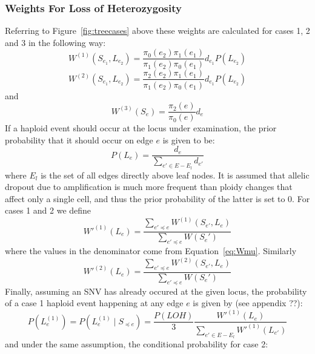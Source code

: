 \documentclass[../../main.tex]{subfiles}
\begin{document}
\subsubsection*{Weights For Loss of Heterozygosity}
 Referring to Figure~\ref{fig:treecases} above these weights are calculated for cases 1, 2 and 3 in the following way:
\begin{equation*}
W^{(1)}(S_{e_1},L_{e_2}) = \frac{\pi_0(e_2)\pi_1(e_1)}{\pi_1(e_2)\pi_0(e_1)}d_{e_1}P(L_{e_2})
\end{equation*}
\begin{equation*}
W^{(2)}(S_{e_1},L_{e_2}) = \frac{\pi_2(e_2)\pi_1(e_1)}{\pi_1(e_2)\pi_0(e_1)}d_{e_1}P(L_{e_2})
\end{equation*}
and
\begin{equation*}
W^{(3)}(S_e) = \frac{\pi_2(e)}{\pi_0(e)}d_e
\end{equation*} 
If a haploid event should occur at the locus under examination, the prior probability that it should occur on edge $e$ is given to be: %
\begin{equation*}
P(L_e) = \frac{d_e}{\sum_{e'\in E-E_l} d_{e'}}
\end{equation*}
where $E_l$ is the set of all edges directly above leaf nodes. It is assumed that allelic dropout due to amplification is much more frequent than ploidy changes that affect only a single cell, and thus the prior probability of the latter is set to 0. For cases 1 and 2 we define
\begin{equation*}
W'^{(1)}(L_e) = \frac{\sum_{e' \preceq e} W^{(1)}(S_{e'},L_e)}{\sum_{e' \preceq e}W(S_e')} 
\end{equation*}
where the values in the denominator come from Equation~\eqref{eq:Wmu}. Similarly
\begin{equation*}
W'^{(2)}(L_e) = \frac{\sum_{e' \preceq e} W^{(2)}(S_{e'},L_e)}{\sum_{e' \preceq e}W(S_e')} 
\end{equation*}
Finally, assuming an SNV has already occured at the given locus, the probability of a case 1 haploid event happening at any edge $e$ is given by (see appendix ??):
\begin{equation*}
P(L_e^{(1)}) = P(L_e^{(1)}\mid S_{\preceq e}) = \frac{P(LOH)}{3} \frac{W'^{(1)}(L_e)}{\sum_{e'\in E-E_l}W'^{(1)}(L_{e'})}
\end{equation*}
and under the same assumption, the conditional probability for case 2:
\end{document}
